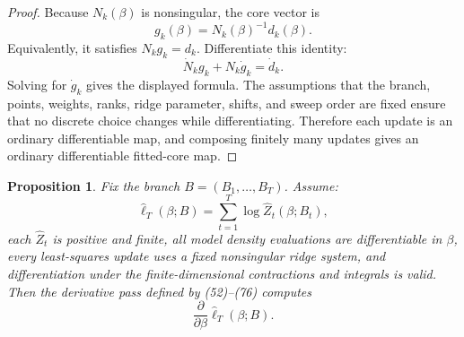 \documentclass[11pt]{article}
\newtheorem{proposition}{Proposition}
\newcommand{\widehatell}{\widehat\ell}
\begin{document}
\begin{proof}
Because \(N_k(\beta)\) is nonsingular, the core vector is
\[
    g_k(\beta)=N_k(\beta)^{-1}d_k(\beta).
\]
Equivalently, it satisfies \(N_k g_k=d_k\).  Differentiate this identity:
\[
    \dot N_k g_k+N_k\dot g_k=\dot d_k.
\]
Solving for \(\dot g_k\) gives the displayed formula.  The assumptions that the
branch, points, weights, ranks, ridge parameter, shifts, and sweep order are
fixed ensure that no discrete choice changes while differentiating.  Therefore
each update is an ordinary differentiable map, and composing finitely many
updates gives an ordinary differentiable fitted-core map.
\end{proof}

\begin{proposition}
Fix the branch \(B=(B_1,\ldots,B_T)\).  Assume:
\[
    \widehatell_T(\beta;B)=\sum_{t=1}^T\log\widehat Z_t(\beta;B_t),
    \tag{P19-85}
\]
each \(\widehat Z_t\) is positive and finite, all model density evaluations are
differentiable in \(\beta\), every least-squares update uses a fixed
nonsingular ridge system, and differentiation under the finite-dimensional
contractions and integrals is valid.  Then the derivative pass defined by
(52)--(76) computes
\[
    \frac{\partial}{\partial\beta}
    \widehatell_T(\beta;B).
    \tag{P19-86}
\]
\end{proposition}
\end{document}
